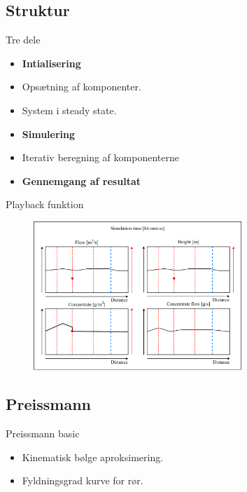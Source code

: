 \subsection{Struktur}
\begin{frame}{Tre dele}{}
\vfill\vfill\centering

\begin{itemize}
	\item \textbf{Intialisering}
	\item<1-> Opsætning af komponenter.
	\item<2-> System i steady state.
	\item<3-> \textbf{Simulering}
	\item<4-> Iterativ beregning af komponenterne
	\item<5-> \textbf{Gennemgang af resultat}
\end{itemize}

\vfill\vfill		
\end{frame}

\begin{frame}{Playback funktion}{}
\vfill\vfill\centering
		\begin{figure}[H]
			\centering
			\includegraphics[width=0.7\textwidth]{Sections/pictures/display_results.pdf}
		\end{figure}
\vfill\vfill		
\end{frame}

\subsection{Preissmann}

\begin{frame}{Preissmann basic}{}
\vfill\vfill\centering
\begin{itemize}
	\item Kinematisk bølge aproksimering.
	\item Fyldningsgrad kurve for rør.
\end{itemize}
\vfill\vfill		
\end{frame}

